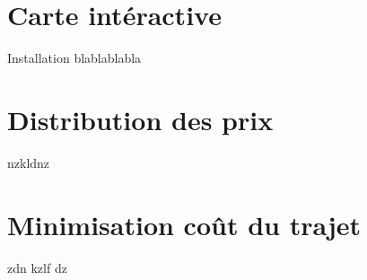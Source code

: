 \documentclass{beamer}
\begin{document}
\section{Carte intéractive}
\begin{frame}
\begin{block}{Installation}
blablablabla
\end{block}
\end{frame}


\section{Distribution des prix}
\begin{frame}
nzkldnz
\end{frame}

\section{Minimisation coût du trajet}
\begin{frame}
zdn kzlf dz
\end{frame}
\end{document}
